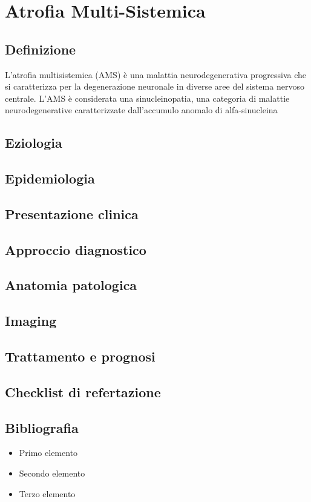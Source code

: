 \section{Atrofia Multi-Sistemica}

\subsection{Definizione}
L'atrofia multisistemica (AMS) è una malattia neurodegenerativa progressiva che si caratterizza per la degenerazione neuronale in diverse aree del sistema nervoso centrale. L'AMS è considerata una sinucleinopatia, una categoria di malattie neurodegenerative caratterizzate dall'accumulo anomalo di alfa-sinucleina

\subsection{Eziologia}

\subsection{Epidemiologia}

\subsection{Presentazione  clinica}

\subsection{Approccio diagnostico}

\subsection{Anatomia patologica}

\subsection{Imaging}

\subsection{Trattamento e prognosi}

\subsection{Checklist di refertazione}

\subsection{Bibliografia}
\small{
	
	
}


\begin{itemize}[label=$\square$] %
	\item Primo elemento
	\item Secondo elemento
	\item Terzo elemento
\end{itemize}